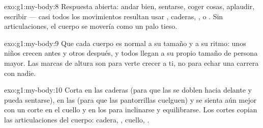 \begin{solution}{exo:g1:my-body:8}
Respuesta abierta: andar bien, sentarse, coger cosas, aplaudir,
escribir --- casi todos los movimientos resultan usar ,
caderas, ,  o . Sin articulaciones, el cuerpo se
movería como un palo tieso.
\end{solution}

\begin{solution}{exo:g1:my-body:9}
Que cada cuerpo es normal a su tamaño y a su ritmo: unos niños crecen
antes y otros después, y todos llegan a su propio tamaño de persona
mayor. Las marcas de altura son para verte crecer a ti, no para echar
una carrera con nadie.
\end{solution}

\begin{solution}{exo:g1:my-body:10}
Corta en las caderas (para que las  se doblen hacia delante y
pueda sentarse), en las  (para que las pantorrillas cuelguen)
y se sienta aún mejor con un corte en el cuello y en los  para
inclinarse y equilibrarse. Los cortes copian las articulaciones del
cuerpo: cadera, , cuello, .
\end{solution}
